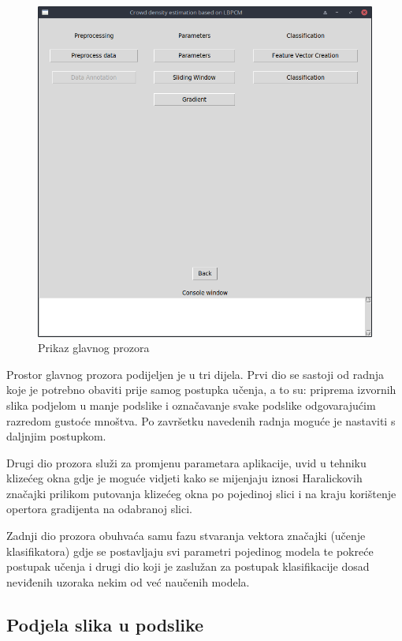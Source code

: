 \documentclass[times, utf8, zavrsni, numeric]{fer}
\begin{document}
\begin{figure}[!ht]
\centering
\includegraphics[scale=0.37]{img/mainscreen.png}
\caption{Prikaz glavnog prozora}
\end{figure}

Prostor glavnog prozora podijeljen je u tri dijela. Prvi dio se sastoji
od radnja koje je potrebno obaviti prije samog postupka učenja, a to su:
priprema izvornih slika podjelom u manje podslike i označavanje svake 
podslike odgovarajućim razredom gustoće mnoštva. Po završetku navedenih radnja
moguće je nastaviti s daljnjim postupkom.

\newpage

Drugi dio prozora služi za promjenu parametara aplikacije, uvid u tehniku 
klizećeg okna gdje je moguće vidjeti kako se mijenjaju iznosi Haralickovih značajki
prilikom putovanja klizećeg okna po pojedinoj slici i na kraju korištenje
opertora gradijenta na odabranoj slici.

\bigbreak

Zadnji dio prozora obuhvaća samu fazu stvaranja vektora značajki (učenje
klasifikatora) gdje se postavljaju svi parametri pojedinog modela te pokreće
postupak učenja i drugi dio koji je zaslužan za postupak klasifikacije
dosad neviđenih uzoraka nekim od već naučenih modela.


\subsection{Podjela slika u podslike}
\end{document}

